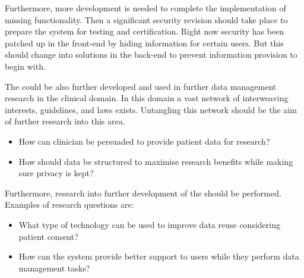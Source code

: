 Furthermore, more development is needed to complete the implementation of missing functionality.
Then a significant security revision should take place to prepare the system for testing and certification.
Right now security has been patched up in the front-end by hiding information for certain users. 
But this should change into solutions in the back-end to prevent information provision to begin with.

The \ivfsystem{} could be also further developed and used in further data management research in the clinical domain.
In this domain a vast network of interweaving interests, guidelines, and laws exists.
Untangling this network should be the aim of further research into this area.
\begin{itemize}
	\item How can clinician be persuaded to provide patient data for research?
	\item How should data be structured to maximise research benefits while making sure privacy is kept?
\end{itemize}

Furthermore, research into further development of the \ivfsystem{} should be performed.
Examples of research questions are:

\begin{itemize}
	\item What type of technology can be used to improve data reuse considering patient consent?
	\item How can the system provide better support to users while they perform data management tasks?
\end{itemize}
